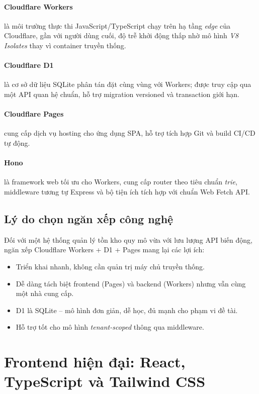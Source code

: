 \paragraph{Cloudflare Workers \cite{cloudflareWorkers}} là môi trường thực thi JavaScript/TypeScript chạy trên hạ tầng \emph{edge} của Cloudflare, gần với người dùng cuối, độ trễ khởi động thấp nhờ mô hình \emph{V8 Isolates} thay vì container truyền thống.

\paragraph{Cloudflare D1 \cite{cloudflareD1}} là cơ sở dữ liệu SQLite phân tán đặt cùng vùng với Workers; được truy cập qua một API quan hệ chuẩn, hỗ trợ migration versioned và transaction giới hạn.

\paragraph{Cloudflare Pages} cung cấp dịch vụ hosting cho ứng dụng SPA, hỗ trợ tích hợp Git và build CI/CD tự động.

\paragraph{Hono \cite{honoFramework}} là framework web tối ưu cho Workers, cung cấp router theo tiêu chuẩn \emph{trie}, middleware tương tự Express và bộ tiện ích tích hợp với chuẩn Web Fetch API.

\subsection{Lý do chọn ngăn xếp công nghệ}
Đối với một hệ thống quản lý tồn kho quy mô vừa với lưu lượng API biến động, ngăn xếp Cloudflare Workers + D1 + Pages mang lại các lợi ích:
\begin{itemize}[leftmargin=1.2cm]
    \item Triển khai nhanh, không cần quản trị máy chủ truyền thống.
    \item Dễ dàng tách biệt frontend (Pages) và backend (Workers) nhưng vẫn cùng một nhà cung cấp.
    \item D1 là SQLite -- mô hình đơn giản, dễ học, đủ mạnh cho phạm vi đề tài.
    \item Hỗ trợ tốt cho mô hình \emph{tenant-scoped} thông qua middleware.
\end{itemize}

\section{Frontend hiện đại: React, TypeScript và Tailwind CSS}

